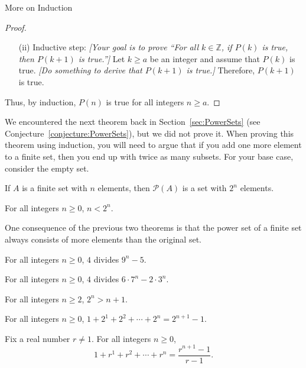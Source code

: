 \begin{section}{More on Induction}
\begin{skeleton}
\begin{mdframed}[style=skeleton]
\begin{proof}
\begin{enumerate}
\item[(ii)] Inductive step:  \emph{[Your goal is to prove ``For all $k\in\mathbb{Z}$, if $P(k)$ is true, then $P(k+1)$ is true.'']} Let $k \ge a$ be an integer and assume that $P(k)$ is true. \emph{[Do something to derive that $P(k+1)$ is true.]} Therefore, $P(k+1)$ is true.
\end{enumerate}
Thus, by induction, $P(n)$ is true for all integers $n \ge a$.
\end{proof}
\end{mdframed}
\end{skeleton}

We encountered the next theorem back in Section~\ref{sec:PowerSets} (see Conjecture~\ref{conjecture:PowerSets}), but we did not prove it. When proving this theorem using induction, you will need to argue that if you add one more element to a finite set, then you end up with twice as many subsets. For your base case, consider the empty set.

\begin{theorem}\label{thm:size of power set for finite sets}
If $A$ is a finite set with $n$ elements, then $\mathcal{P}(A)$ is a set with $2^{n}$ elements.
\end{theorem}

\begin{theorem}\label{thm:n<2^n}
For all integers $n \ge 0$, $n<2^n$.
\end{theorem}

One consequence of the previous two theorems is that the power set of a finite set always consists of more elements than the original set.

\begin{theorem}
For all integers $n \ge 0$, $4$ divides $9^n - 5$.
\end{theorem}

\begin{theorem}
For all integers $n \ge 0$, $4$ divides $6\cdot 7^n - 2 \cdot 3^n$.
\end{theorem}

\begin{theorem}
For all integers $n \ge 2$, $2^n > n + 1$.
\end{theorem}

\begin{theorem}
For all integers $n \ge 0$, $1 + 2^1 + 2^2 + \cdots + 2^n = 2^{n+1} - 1$.
\end{theorem}

\begin{theorem}
Fix a real number $r \neq 1$. For all integers $n \ge 0$,
$$\displaystyle{1 + r^1 + r^2 + \cdots + r^n = \frac{r^{n+1} - 1}{r-1}}.$$
\end{theorem}


\end{section}
